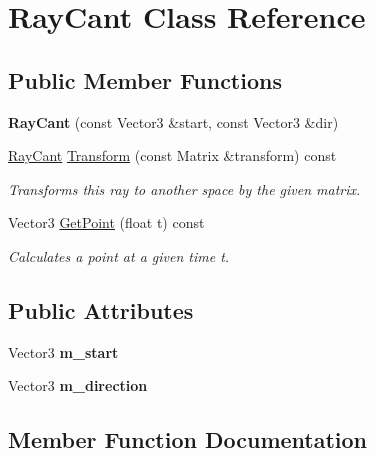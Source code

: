 \hypertarget{classRayCant}{}\section{Ray\+Cant Class Reference}
\label{classRayCant}
\subsection*{Public Member Functions}
\begin{DoxyCompactItemize}
\item 
\mbox{\label{classRayCant_a877eb7e0063451f39c8e4efacebeed11}} 
{\bfseries Ray\+Cant} (const Vector3 \&start, const Vector3 \&dir)
\item 
\hyperlink{classRayCant}{Ray\+Cant} \hyperlink{classRayCant_aa1732faaf14c4cddc76a57d000147eea}{Transform} (const Matrix \&transform) const
\begin{DoxyCompactList}\small\item\em Transforms this ray to another space by the given matrix. \end{DoxyCompactList}\item 
Vector3 \hyperlink{classRayCant_a47d0b3fbd0dd627ab57d0134aed3110e}{Get\+Point} (float t) const
\begin{DoxyCompactList}\small\item\em Calculates a point at a given time t. \end{DoxyCompactList}\end{DoxyCompactItemize}
\subsection*{Public Attributes}
\begin{DoxyCompactItemize}
\item 
\mbox{\label{classRayCant_adcac88cbb75bf1f3354c8d2745000f6e}} 
Vector3 {\bfseries m\+\_\+start}
\item 
\mbox{\label{classRayCant_aee49a1db3a1b4482cb958af3d1f19930}} 
Vector3 {\bfseries m\+\_\+direction}
\end{DoxyCompactItemize}


\subsection{Member Function Documentation}
\mbox{\label{classRayCant_a47d0b3fbd0dd627ab57d0134aed3110e}} 
